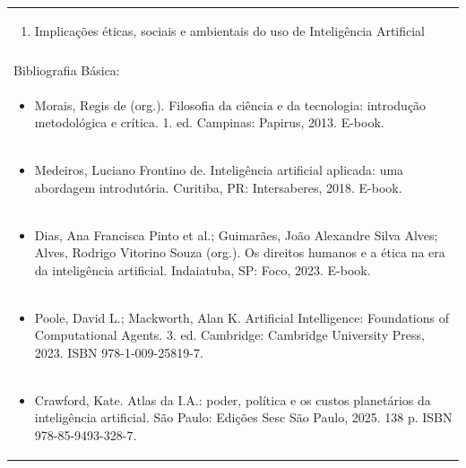 \documentclass[11pt]{article}
\begin{document}
\begin{center}
\begin{longtable}{|p{4cm}|p{4cm}|p{4cm}|p{4cm}|}
\multicolumn{4}{|p{\dimexpr 16cm + 6\tabcolsep\relax}|}{\begin{enumerate}[start=10]\item Implicações éticas, sociais e ambientais do uso de Inteligência Artificial\end{enumerate}}\\
\multicolumn{4}{|p{\dimexpr 16cm + 6\tabcolsep\relax}|}{}\\
\hline
\multicolumn{4}{|p{16cm}|}{Bibliografia Básica:}\\*
\multicolumn{4}{|p{\dimexpr 16cm + 6\tabcolsep\relax}|}{\begin{itemize}\item Morais, Regis de (org.). Filosofia da ciência e da tecnologia: introdução metodológica e crítica. 1. ed. Campinas: Papirus, 2013. E-book.\end{itemize}}\\
\multicolumn{4}{|p{\dimexpr 16cm + 6\tabcolsep\relax}|}{\begin{itemize}\item Medeiros, Luciano Frontino de. Inteligência artificial aplicada: uma abordagem introdutória. Curitiba, PR: Intersaberes, 2018. E-book.\end{itemize}}\\
\multicolumn{4}{|p{\dimexpr 16cm + 6\tabcolsep\relax}|}{\begin{itemize}\item Dias, Ana Francisca Pinto et al.; Guimarães, João Alexandre Silva Alves; Alves, Rodrigo Vitorino Souza (org.). Os direitos humanos e a ética na era da inteligência artificial. Indaiatuba, SP: Foco, 2023. E-book.\end{itemize}}\\
\multicolumn{4}{|p{\dimexpr 16cm + 6\tabcolsep\relax}|}{\begin{itemize}\item Poole, David L.; Mackworth, Alan K. Artificial Intelligence: Foundations of Computational Agents. 3. ed. Cambridge: Cambridge University Press, 2023. ISBN 978-1-009-25819-7.\end{itemize}}\\
\multicolumn{4}{|p{\dimexpr 16cm + 6\tabcolsep\relax}|}{\begin{itemize}\item Crawford, Kate. Atlas da I.A.: poder, política e os custos planetários da inteligência artificial. São Paulo: Edições Sesc São Paulo, 2025. 138 p. ISBN 978-85-9493-328-7.\end{itemize}}\\

\end{longtable}
\end{center}
\end{document}
